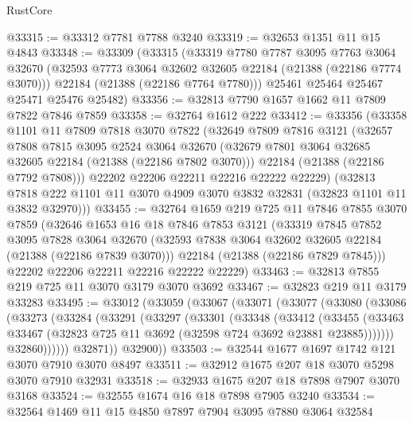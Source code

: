 \begin{lexlean}{RustCore}
\begin{coremodule}
@33315 := @33312 @7781 @7788 @3240
@33319 := @32653 @1351 @11 @15 @4843
@33348 := @33309
    (@33315
      (@33319
        @7780
        @7787
        @3095
        @7763
        @3064
        @32670
        (@32593 @7773 @3064 @32602 @32605 @22184 (@21388 (@22186 @7774 @3070)))
        @22184
        (@21388 (@22186 @7764 @7780)))
      @25461
      @25464
      @25467
      @25471
      @25476
      @25482)
@33356 := @32813 @7790 @1657 @1662 @11 @7809 @7822 @7846 @7859
@33358 := @32764 @1612 @222
@33412 := @33356
    (@33358
      @1101
      @11
      @7809
      @7818
      @3070
      @7822
      (@32649
        @7809
        @7816
        @3121
        (@32657
          @7808
          @7815
          @3095
          @2524
          @3064
          @32670
          (@32679 @7801 @3064 @32685 @32605 @22184 (@21388 (@22186 @7802 @3070)))
          @22184
          (@21388 (@22186 @7792 @7808)))
        @22202
        @22206
        @22211
        @22216
        @22222
        @22229)
      (@32813 @7818 @222 @1101 @11 @3070 @4909 @3070 @3832 @32831 (@32823 @1101 @11 @3832 @32970)))
@33455 := @32764
    @1659
    @219
    @725
    @11
    @7846
    @7855
    @3070
    @7859
    (@32646
      @1653
      @16
      @18
      @7846
      @7853
      @3121
      (@33319
        @7845
        @7852
        @3095
        @7828
        @3064
        @32670
        (@32593 @7838 @3064 @32602 @32605 @22184 (@21388 (@22186 @7839 @3070)))
        @22184
        (@21388 (@22186 @7829 @7845)))
      @22202
      @22206
      @22211
      @22216
      @22222
      @22229)
@33463 := @32813 @7855 @219 @725 @11 @3070 @3179 @3070 @3692
@33467 := @32823 @219 @11 @3179 @33283
@33495 := @33012
    (@33059
      (@33067
        (@33071
          (@33077
            (@33080
              (@33086
                (@33273
                  (@33284
                    (@33291
                      (@33297
                        (@33301
                          (@33348
                            (@33412
                              (@33455
                                (@33463
                                  @33467
                                  (@32823 @725 @11 @3692 (@32598 @724 @3692 @23881 @23885)))))))
                        @32860))))))
            @32871))
        @32900))
@33503 := @32544 @1677 @1697 @1742 @121 @3070 @7910 @3070 @8497
@33511 := @32912 @1675 @207 @18 @3070 @5298 @3070 @7910 @32931
@33518 := @32933 @1675 @207 @18 @7898 @7907 @3070 @3168
@33524 := @32555 @1674 @16 @18 @7898 @7905 @3240
@33534 := @32564 @1469 @11 @15 @4850 @7897 @7904 @3095 @7880 @3064 @32584

\end{coremodule}
\end{lexlean}
